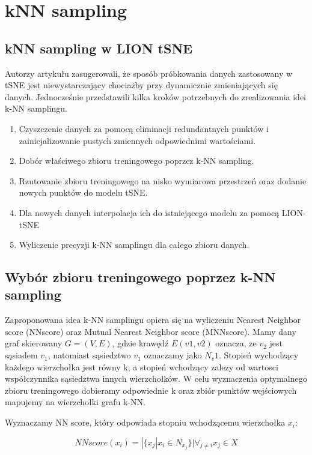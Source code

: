 \documentclass{article}
\begin{document}
\section{kNN sampling}
\label{sec:kNN}

\subsection{kNN sampling w LION tSNE}

Autorzy artykułu zasugerowali, że sposób próbkowania danych zastosowany
w tSNE jest niewystarczający chociażby przy dynamicznie zmieniających się
danych. Jednocześnie przedstawili kilka kroków potrzebnych do
zrealizowania idei k-NN samplingu.
\begin{enumerate}
    \item Czyszczenie danych za pomocą eliminacji redundantnych punktów i
zainicjalizowanie pustych zmiennych odpowiednimi wartościami.
\item
 Dobór właściwego zbioru treningowego poprzez k-NN sampling.
 \item
 Rzutowanie zbioru treningowego na nisko wymiarowa przestrzeń oraz
dodanie nowych punktów do modelu tSNE.
 \item
 Dla nowych danych interpolacja ich do istniejącego modelu za pomocą
LION-tSNE
 \item
 Wyliczenie precyzji k-NN samplingu dla całego zbioru danych.
\end{enumerate}

\subsection{Wybór zbioru treningowego poprzez k-NN sampling}

Zaproponowana idea k-NN samplingu opiera się na wyliczeniu Nearest
Neighbor score (NNscore) oraz Mutual Nearest Neighbor score
(MNNscore). Mamy dany graf skierowany $G = (V, E)$, gdzie krawędź
$E(v1, v2)$ oznacza, ze $v_2$ jest sąsiadem $v_1$, natomiast sąsiedztwo $v_1$
oznaczamy jako $N_v1$. Stopień wychodzący każdego wierzchołka jest równy
k, a stopień wchodzący zalezy od wartosci współczynnika sąsiedztwa innych
wierzchołków. W celu wyznaczenia optymalnego zbioru treningowego
dobieramy odpowiednie k oraz zbiór punktów wejściowych mapujemy na
wierzchołki grafu k-NN.

Wyznaczamy NN score, który odpowiada stopniu wchodzącemu
wierzchołka $x_i$:

\begin{equation}
    NNscore(x_i) = |\{x_j | x_i \in N_x_j \} | \forall_{j \neq i} x_j \in X
\end{equation}
\end{document}
